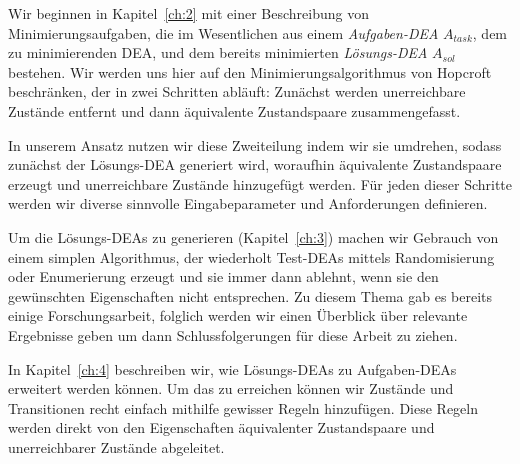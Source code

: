 Wir beginnen in Kapitel~\ref{ch:2} mit einer Beschreibung von Minimierungsaufgaben, die im Wesentlichen aus einem \emph{Aufgaben-DEA} $A_{task}$, dem zu minimierenden DEA, und dem bereits minimierten \emph{Lösungs-DEA} $A_{sol}$ bestehen. Wir werden uns hier auf den Minimierungsalgorithmus von Hopcroft beschränken, der in zwei Schritten abläuft: Zunächst werden unerreichbare Zustände entfernt und dann äquivalente Zustandspaare zusammengefasst.

In unserem Ansatz nutzen wir diese Zweiteilung indem wir sie umdrehen, sodass zunächst der Lösungs-DEA generiert wird, woraufhin äquivalente Zustandspaare erzeugt und unerreichbare Zustände hinzugefügt werden. Für jeden dieser Schritte werden wir diverse sinnvolle Eingabeparameter und Anforderungen definieren.

Um die Lösungs-DEAs zu generieren (Kapitel~\ref{ch:3}) machen wir Gebrauch von einem simplen Algorithmus, der wiederholt Test-DEAs mittels Randomisierung oder Enumerierung erzeugt und sie immer dann ablehnt, wenn sie den gewünschten Eigenschaften nicht entsprechen. Zu diesem Thema gab es bereits einige Forschungsarbeit, folglich werden wir einen Überblick über relevante Ergebnisse geben um dann Schlussfolgerungen für diese Arbeit zu ziehen.

In Kapitel~\ref{ch:4} beschreiben wir, wie Lösungs-DEAs zu Aufgaben-DEAs erweitert werden können. Um das zu erreichen können wir Zustände und Transitionen recht einfach mithilfe gewisser Regeln hinzufügen. Diese Regeln werden direkt von den Eigenschaften äquivalenter Zustandspaare und unerreichbarer Zustände abgeleitet.
	